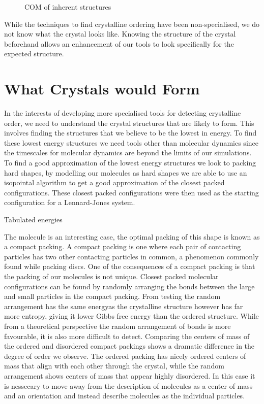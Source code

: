 \begin{figure}
    \caption{COM of inherent structures}
    \label{fig:inherent structures com}
\end{figure}

While the techniques to find crystalline ordering have been non-specialised, we do not know what the crystal looks like. Knowing the structure of the crystal beforehand allows an enhancement of our tools to look specifically for the expected structure.

\section{What Crystals would Form}

In the interests of developing more specialised tools for detecting crystalline order, we need to understand the crystal structures that are likely to form. This involves finding the structures that we believe to be the lowest in energy. To find these lowest energy structures we need tools other than molecular dynamics since the timescales for molecular dynamics are beyond the limits of our simulations. To find a good approximation of the lowest energy structures we look to packing hard shapes, by modelling our molecules as hard shapes we are able to use an isopointal algorithm to get a good approximation of the closest packed configurations. These closest packed configurations were then used as the starting configuration for a Lennard-Jones system.

\begin{table}
    \caption{Tabulated energies}
\end{table}
The \scon molecule is an interesting case, the optimal packing of this shape is known as a compact packing. A compact packing is one where each pair of contacting particles has two other contacting particles in common, a phenomenon commonly found while packing discs. One of the consequences of a compact packing is that the packing of our \scon molecules is not unique.  Closest packed molecular configurations can be found by randomly arranging the bonds between the large and small particles in the compact packing. From testing the random arrangement has the same energy\tocheck as the crystalline structure however has far more entropy, giving it lower Gibbs free energy than the ordered structure. While from a theoretical perspective the random arrangement of bonds is more favourable, it is also more difficult to detect. Comparing the centers of mass of the ordered and disordered compact packings shows a dramatic difference in the degree of order we observe. The ordered packing has nicely ordered centers of mass that align with each other through the crystal, while the random arrangement shows centers of mass that appear highly disordered. In this case it is nessecary to move away from the description of molecules as a center of mass and an orientation and instead describe molecules as the individual particles.

